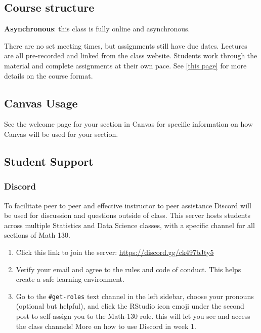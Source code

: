 \documentclass[
  11pt,
]{article}
\providecommand{\tightlist}{%
  \setlength{\itemsep}{0pt}\setlength{\parskip}{0pt}}
\begin{document}
\subsection{Course structure}\label{course-structure}

\textbf{Asynchronous}: this class is fully online and asynchronous.

There are no set meeting times, but assignments still have due dates.
Lectures are all pre-recorded and linked from the class website.
Students work through the material and complete assignments at their own
pace. See
\href{https://norcalbiostat.github.io/MATH130/notes/01c_async_protocol.html}{{[}this
page{]}} for more details on the course format.

\subsection{Canvas Usage}\label{canvas-usage}

See the welcome page for your section in Canvas for specific information
on how Canvas will be used for your section.

\subsection{Student Support}\label{student-support}

\subsubsection{Discord}\label{discord}

To facilitate peer to peer and effective instructor to peer assistance
Discord will be used for discussion and questions outside of class. This
server hosts students across multiple Statistics and Data Science
classes, with a specific channel for all sections of Math 130.

\begin{enumerate}
\def\labelenumi{\arabic{enumi}.}
\tightlist
\item
  Click this link to join the server:
  \url{https://discord.gg/ck497bJty5}
\item
  Verify your email and agree to the rules and code of conduct. This
  helps create a safe learning environment.
\item
  Go to the \texttt{\#get-roles} text channel in the left sidebar,
  choose your pronouns (optional but helpful), and click the RStudio
  icon emoji under the second post to self-assign you to the Math-130
  role. this will let you see and access the class channels! More on how
  to use Discord in week 1.
\end{enumerate}
\end{document}
